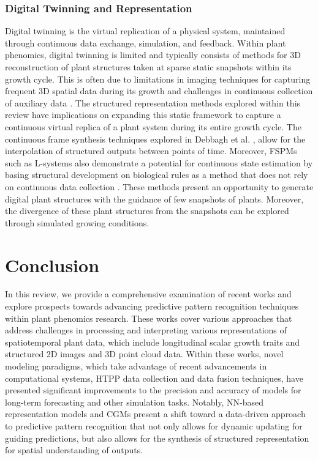 \documentclass{article}
\begin{document}
\subsubsection{Digital Twinning and Representation}
Digital twinning is the virtual replication of a physical system, maintained through continuous data exchange, simulation, and feedback. 
Within plant phenomics, digital twinning is limited and typically consists of methods for 3D reconstruction of plant structures taken at sparse static snapshots within its growth cycle. 
This is often due to limitations in imaging techniques for capturing frequent 3D spatial data during its growth and challenges in continuous collection of auxiliary data \cite{harandi2023make,LI2022106712}. 
The structured representation methods explored within this review have implications on expanding this static framework to capture a continuous virtual replica of a plant system during its entire growth cycle. 
The continuous frame synthesis techniques explored in Debbagh et al. \cite{Debbagh2024SIPGS}, allow for the interpolation of structured outputs between points of time. 
Moreover, FSPMs such as L-systems also demonstrate a potential for continuous state estimation by basing structural development on biological rules as a method that does not rely on continuous data collection \cite{MITSANIS2024108733}. 
These methods present an opportunity to generate digital plant structures with the guidance of few snapshots of plants. 
Moreover, the divergence of these plant structures from the snapshots can be explored through simulated growing conditions. 

\section{Conclusion}

In this review, we provide a comprehensive examination of recent works and explore prospects towards advancing predictive pattern recognition techniques within plant phenomics research. These works cover various approaches that address challenges in processing and interpreting various representations of spatiotemporal plant data, which include longitudinal scalar growth traits and structured 2D images and 3D point cloud data. Within these works, novel modeling paradigms, which take advantage of recent advancements in computational systems, HTPP data collection and data fusion techniques, have presented significant improvements to the precision and accuracy of models for long-term forecasting and other simulation tasks. Notably, NN-based representation models and CGMs present a shift toward a data-driven approach to predictive pattern recognition that not only allows for dynamic updating for guiding predictions, but also allows for the synthesis of structured representation for spatial understanding of outputs.
\end{document}
